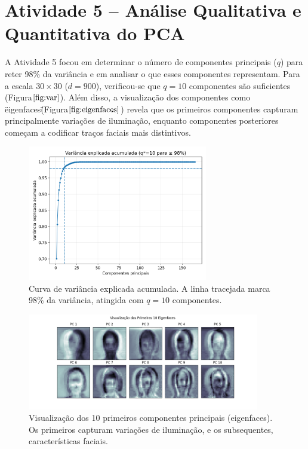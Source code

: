 \documentclass[11pt,a4paper]{article}
\begin{document}
\section{Atividade 5 – Análise Qualitativa e Quantitativa do PCA}

A Atividade 5 focou em determinar o número de componentes principais (\(q\)) para reter 98\% da variância e em analisar o que esses componentes representam. Para a escala \(30 \times 30\) (\(d=900\)), verificou-se que \(q=10\) componentes são suficientes (Figura\(\ref{fig:var}\)). Além disso, a visualização dos componentes como \"eigenfaces\" (Figura\(\ref{fig:eigenfaces}\)) revela que os primeiros componentes capturam principalmente variações de iluminação, enquanto componentes posteriores começam a codificar traços faciais mais distintivos.

\begin{figure}[h!]
  \centering
  \includegraphics[width=0.7\textwidth]{results/TC2/pca_variance_explained_A3.png}
  \caption{Curva de variância explicada acumulada. A linha tracejada marca 98\% da variância, atingida com \(q=10\) componentes.}
  \label{fig:var}
\end{figure}

\begin{figure}[h!]
  \centering
  \includegraphics[width=0.9\textwidth]{results/TC2/eigenfaces_visualization.png}
  \caption{Visualização dos 10 primeiros componentes principais (eigenfaces). Os primeiros capturam variações de iluminação, e os subsequentes, características faciais.}
  \label{fig:eigenfaces}
\end{figure}
\end{document}
